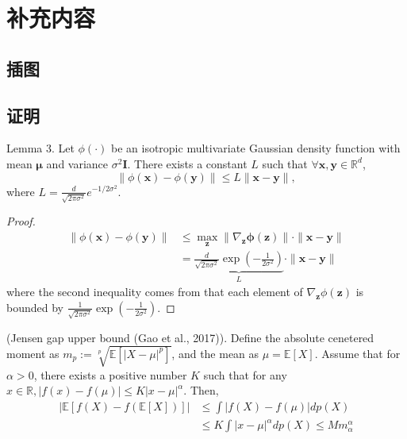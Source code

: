 
\chapter{补充内容}
\section{插图}


\section{证明}
\begin{lemma}
    Lemma 3. Let $\phi(\cdot)$ be an isotropic multivariate Gaussian density function with mean $\boldsymbol{\mu}$ and variance $\sigma^2 \boldsymbol{I}$. There exists a constant $L$ such that $\forall \boldsymbol{x}, \boldsymbol{y} \in \mathbb{R}^d$,
$$
\|\phi(\boldsymbol{x})-\phi(\boldsymbol{y})\| \leq L\|\boldsymbol{x}-\boldsymbol{y}\|,
$$
where $L=\frac{d}{\sqrt{2 \pi \sigma^2}} e^{-1 / 2 \sigma^2}$.
\end{lemma}
\begin{proof}
    \begin{align}
\|\phi(\boldsymbol{x})-\phi(\boldsymbol{y})\| & \leq \max _{\boldsymbol{z}}\left\|\nabla_{\boldsymbol{z}} \boldsymbol{\phi}(\boldsymbol{z})\right\| \cdot\|\boldsymbol{x}-\boldsymbol{y}\| \\
& =\underbrace{\frac{d}{\sqrt{2 \pi \sigma^2}} \exp \left(-\frac{1}{2 \sigma^2}\right)}_L \cdot\|\boldsymbol{x}-\boldsymbol{y}\|
\end{align}
where the second inequality comes from that each element of $\nabla_{\boldsymbol{z}} \phi(\boldsymbol{z})$ is bounded by $\frac{1}{\sqrt{2 \pi \sigma^2}} \exp \left(-\frac{1}{2 \sigma^2}\right)$.
\end{proof}


\begin{proposition}
     (Jensen gap upper bound (Gao et al., 2017)). Define the absolute cenetered moment as $m_p:=\sqrt[p]{\mathbb{E}\left[|X-\mu|^p\right]}$, and the mean as $\mu=\mathbb{E}[X]$. Assume that for $\alpha>0$, there exists a positive number $K$ such that for any $x \in \mathbb{R},|f(x)-f(\mu)| \leq K|x-\mu|^\alpha$. Then,
\begin{align}
|\mathbb{E}[f(X)-f(\mathbb{E}[X])]| & \leq \int|f(X)-f(\mu)| d p(X) \\
& \leq K \int|x-\mu|^\alpha d p(X) \leq M m_\alpha^\alpha
\end{align}
\end{proposition}

